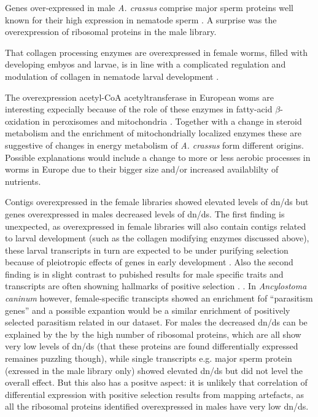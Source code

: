 \documentclass[10pt]{bmc_article}
\newenvironment{bmcformat}{\begin{raggedright}\baselineskip20pt\sloppy\setboolean{publ}{false}}{\end{raggedright}\baselineskip20pt\sloppy}
\begin{document}
\begin{bmcformat}
Genes over-expressed in male \textit{A. crassus} comprise major sperm
proteins well known for their high expression in nematode sperm
\cite{pmid15275275}. A surprise was the overexpression of ribosomal
proteins in the male library.  

That collagen processing enzymes are overexpressed in female worms,
filled with developing embyos and larvae, is in line with a
complicated regulation and modulation of collagen in nematode larval
development \cite{pmid10637627}.

The overexpression acetyl-CoA acetyltransferase in European woms are
interesting expecially because of the role of these enzymes in
fatty-acid $\beta$-oxidation in peroxisomes and mitochondria
\cite{pmid4721607}. Together with a change in steroid metabolism and
the enrichment of mitochondrially localized enzymes these are
suggestive of changes in energy metabolism of \textit{A. crassus} form
different origins. Possible explanations would include a change to
more or less aerobic processes in worms in Europe due to their bigger
size and/or increased availablilty of nutrients.

Contigs overexpressed in the female libraries showed elevated levels
of dn/ds but genes overexpressed in males decreased levels of
dn/ds. The first finding is unexpected, as overexpressed in female
libraries will also contain contigs related to larval development
(such as the collagen modifying enzymes discussed above), these larval
transcripts in turn are expected to be under purifying selection
because of pleiotropic effects of genes in early development
\cite{pmid15371532}. Also the second finding is in slight contrast to
pubished results for male specific traits and transcripts are often
showning hallmarks of positive selection
\cite{pmid15795858,pmid11404480}. . In \textit{Ancylostoma caninum}
however, female-specific transcipts showed an enrichment fof
``parasitism genes'' \cite{pmid20470405} and a possible expantion
would be a similar enrichment of positively selected parasitism
related in our dataset. For males the decreased dn/ds can be explained
by the by the high number of ribosomal proteins, which are all show
very low levels of dn/ds (that these proteins are found differentially
expressed remaines puzzling though), while single transcripts
e.g. major sperm protein (exressed in the male library only) showed
elevated dn/ds but did not level the overall effect. But this also has
a positve aspect: it is unlikely that correlation of differential
expression with positive selection results from mapping artefacts, as
all the ribosomal proteins identified overexpressed in males have very
low dn/ds.


\end{bmcformat}
\end{document}
